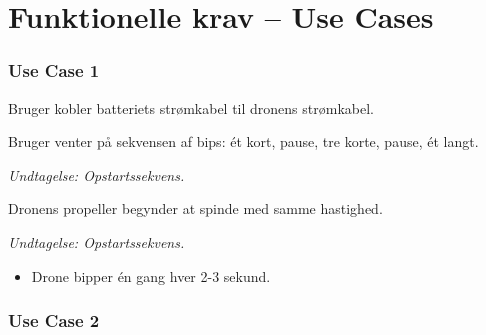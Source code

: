 \documentclass[Main]{subfiles}
\begin{document}
\chapter{Funktionelle krav -- Use Cases}


\subsection{Use Case 1}

\begin{UseCase}

	\begin{normFor}
	\item Bruger kobler batteriets strømkabel til dronens strømkabel.
	\item Bruger venter på sekvensen af bips: ét kort, pause, tre korte, pause, ét langt.
	\item[]	\textit{Undtagelse: Opstartssekvens.}
	\item Dronens propeller begynder at spinde med samme hastighed.
	\end{normFor} 

	\begin{normFor}
	\item \textit{Undtagelse: Opstartssekvens.}
	\begin{itemize}
	\item Drone bipper én gang hver 2-3 sekund.
	\end{itemize}
	\end{normFor} 
\end{UseCase}



\subsection{Use Case 2}
\end{document}
